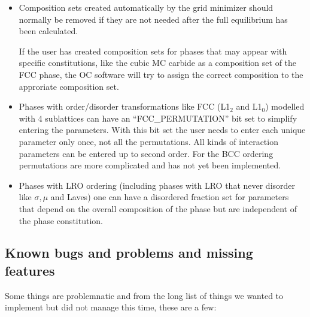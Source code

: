 \documentclass[12pt]{article}
\begin{document}
\begin{enumerate}
\begin{itemize}
\item Composition sets created automatically by the grid minimizer
  should normally be removed if they are not needed after the full
  equilibrium has been calculated.  

  If the user has created composition sets for phases that may appear
  with specific constitutions, like the cubic MC carbide as a
  composition set of the FCC phase, the OC software will try to assign
  the correct composition to the approriate composition set.

\item Phases with order/disorder transformations like FCC (L1$_2$ and
  L1$_0$) modelled with 4 sublattices can have an ``FCC\_PERMUTATION''
  bit set to simplify entering the parameters.  With this bit set the
  user needs to enter each unique parameter only once, not all the
  permutations.  All kinds of interaction parameters can be entered up
  to second order.  For the BCC ordering permutations are more
  complicated and has not yet been implemented.

\item Phases with LRO ordering (including phases with LRO that never
  disorder like $\sigma, \mu$ and Laves) one can have a disordered
  fraction set for parameters that depend on the overall composition
  of the phase but are independent of the phase constitution.
\end{itemize}

\end{enumerate}

\subsection{Known bugs and problems and missing features}\label{sc:bugs}

Some things are problemnatic and from the long list of things we wanted
to implement but did not manage this time, these are a few:
\end{document}
